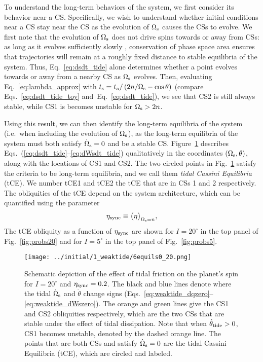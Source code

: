 \documentclass[
        fleqn,
        usenatbib,
    ]{mnras}
\newcommand*{\p}[1]{\left(#1\right)}
\begin{document}
To understand the long-term behaviors of the system, we first consider its
behavior near a CS\@. Specifically, we wish to understand whether initial
conditions near a CS stay near the CS as the evolution of $\Omega_{\rm s}$
causes the CSs to evolve. We first note that the evolution of
$\Omega_{\rm s}$ does not drive spins towards or away from CSs: as long as it
evolves sufficiently slowly \citep[adiabatically,][]{su2020}, conservation of
phase space area ensures that trajectories will remain at a roughly fixed
distance to stable equilibria of the system. Thus, Eq.~\eqref{eq:dsdt_tide}
alone determines whether a point evolves towards or away from a nearby CS as
$\Omega_{\rm s}$ evolves. Then, evaluating Eq.~\eqref{eq:lambda_approx} with
$t_{\rm s} = t_{\rm a} / \p{2n / \Omega_{\rm s} - \cos \theta}$ (compare
Eqs.~\ref{eq:dsdt_tide_toy} and~Eq.~\ref{eq:dsdt_tide}), we see that CS2 is
still always stable, while CS1 is becomes unstable for $\Omega_{\rm s} > 2n$.

Using this result, we can then identify the long-term equilibria of the system
(i.e.\ when including the evolution of $\Omega_{\rm s}$), as the long-term
equilibria of the system must both satisfy $\dot{\Omega}_{\rm s} = 0$ and be a
stable CS\@. Figure~\ref{fig:6equils} describes
Eqs.~(\ref{eq:dsdt_tide}--\ref{eq:dWsdt_tide}) qualitatively in the coordinates
$(\Omega_{\rm s}, \theta)$, along with the locations of CS1 and CS2. The two
circled points in Fig.~\ref{fig:6equils} satisfy the criteria to be long-term
equilibria, and we call them \emph{tidal Cassini Equilibria} (tCE). We number
tCE1 and tCE2 the tCE that are in CSs 1 and 2 respectively. The obliquities of
the tCE depend on the system architecture, which can be quantified using the
parameter
\begin{equation}
    \eta_{\rm sync} \equiv \big(\eta\big)_{\Omega_{\rm s} = n},
        \label{eq:def_etasync}
\end{equation}
The tCE obliquity as a function of $\eta_{\rm sync}$ are shown for $I =
20^\circ$ in the top panel of Fig.~\ref{fig:probs20} and for $I = 5^\circ$ in
the top panel of Fig.~\ref{fig:probs5}.
\begin{figure}
    \centering
    \texttt{[image: ../initial/1\_weaktide/6equils0\_20.png]}
    \caption{Schematic depiction of the effect of tidal friction on the planet's
    spin for $I = 20^\circ$ and $\eta_{\rm sync} = 0.2$. The black and blue lines
    denote where the tidal $\dot{\Omega}_{\rm s}$ and $\dot{\theta}$ change
    signs (Eqs.~\ref{eq:weaktide_dqzero}--\ref{eq:weaktide_dWszero}). The orange
    and green lines give the CS1 and CS2 obliquities respectively, which are the
    two CSs that are stable under the effect of tidal dissipation. Note that
    when $\dot{\theta}_{\rm tide} > 0$, CS1 becomes unstable, denoted by the
    dashed orange line. The points that are both CSs and satisfy
    $\dot{\Omega}_{\rm s} = 0$ are the tidal Cassini Equilibria (tCE), which are
    circled and labeled. }\label{fig:6equils}
\end{figure}
\end{document}
